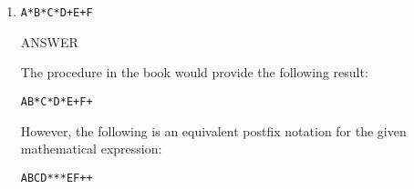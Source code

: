 \documentclass{article} %
\begin{document}
\begin{enumerate}
\begin{enumerate}
      
  \item
    \verb|A*B*C*D+E+F|

    \begin{minipage}{4.5in}
      \vspace{.1in}
      ANSWER

      The procedure in the book would provide the following result:
      
          \verb|AB*C*D*E+F+|

      However, the following is an equivalent postfix notation for the given
      mathematical expression:

          \verb|ABCD***EF++|

      \vspace{.1in}
    \end{minipage}

  \end{enumerate}


  
\end{enumerate}
\end{document}
